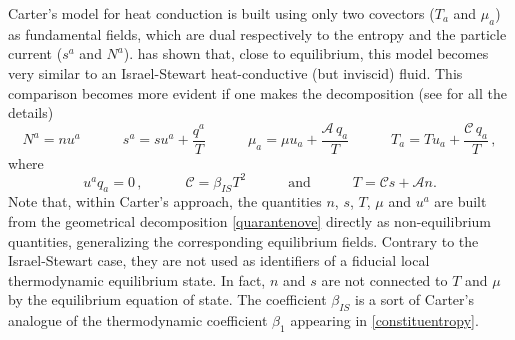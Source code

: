 \documentclass[a4paper, amsfonts, amssymb, amsmath, reprint, showkeys, nofootinbib, twoside, onecolumn,notitlepage]{revtex4-1}
\newcommand{\spc}{\quad \quad \quad}
\begin{document}
Carter's model for heat conduction \cite{noto_rel} is built using only two covectors ($T_a$ and $\mu_a$) as fundamental fields, which are dual respectively to the entropy and the particle current ($s^a$ and $N^a$). \citet{PriouCOMPAR1991} has shown that, close to equilibrium, this model becomes very similar to an Israel-Stewart heat-conductive (but inviscid) fluid. This comparison becomes more evident if one makes the decomposition (see \citet{Lopez09} for all the details)
\begin{equation}\label{quarantenove}
N^a = n u^a  \spc s^a = su^a + \dfrac{q^a}{T}   \spc \mu_a = \mu u_a + \dfrac{\mathcal{A} \, q_a}{T} \spc T_a =Tu_a + \dfrac{\mathcal{C} \, q_a}{T} \, ,
\end{equation}
where
\begin{equation}
u^a q_a=0 \, , \spc \mathcal{C}= \beta_{IS} T^2  \spc \text{and} \spc T = \mathcal{C}s+\mathcal{A}n.
\end{equation}
Note that, within Carter's approach, the quantities $n$, $s$, $T$, $\mu$ and $u^a$ are built from the geometrical decomposition \eqref{quarantenove} directly as non-equilibrium quantities, generalizing the corresponding equilibrium fields. Contrary to the Israel-Stewart case, they are not used as identifiers of a fiducial local thermodynamic equilibrium state. In fact, $n$ and $s$ are not connected to $T$ and $\mu$ by the equilibrium equation of state. The coefficient $\beta_{IS}$ is a sort of Carter's analogue of the thermodynamic coefficient $\beta_1$ appearing in \eqref{constituentropy}.
\end{document}
